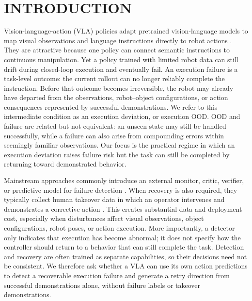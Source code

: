 \documentclass[letterpaper, 10 pt, conference]{ieeeconf}
\begin{document}
\section{INTRODUCTION}

Vision-language-action (VLA) policies adapt pretrained vision-language models to map visual observations and language instructions directly to robot actions \cite{rt2,openvla,starvla}. They are attractive because one policy can connect semantic instructions to continuous manipulation. Yet a policy trained with limited robot data can still drift during closed-loop execution and eventually fail. An execution failure is a task-level outcome: the current rollout can no longer reliably complete the instruction. Before that outcome becomes irreversible, the robot may already have departed from the observations, robot--object configurations, or action consequences represented by successful demonstrations. We refer to this intermediate condition as an execution deviation, or execution OOD. OOD and failure are related but not equivalent: an unseen state may still be handled successfully, while a failure can also arise from compounding errors within seemingly familiar observations. Our focus is the practical regime in which an execution deviation raises failure risk but the task can still be completed by returning toward demonstrated behavior.

Mainstream approaches commonly introduce an external monitor, critic, verifier, or predictive model for failure detection \cite{faildetect}. When recovery is also required, they typically collect human takeover data in which an operator intervenes and demonstrates a corrective action \cite{dagger,sirius,intervengen}. This creates substantial data and deployment cost, especially when disturbances affect visual observations, object configurations, robot poses, or action execution. More importantly, a detector only indicates that execution has become abnormal; it does not specify how the controller should return to a behavior that can still complete the task. Detection and recovery are often trained as separate capabilities, so their decisions need not be consistent. We therefore ask whether a VLA can use its own action predictions to detect a recoverable execution failure and generate a retry direction from successful demonstrations alone, without failure labels or takeover demonstrations.
\end{document}
